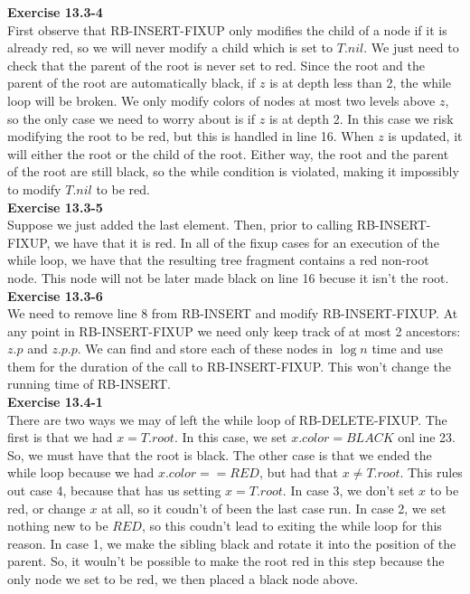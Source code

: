 \documentclass{article}
\begin{document}
\noindent\textbf{Exercise 13.3-4}\\

First observe that RB-INSERT-FIXUP only modifies the child of a node if it is already red, so we will never modify a child which is set to $T.nil$.  We just need to check that the parent of the root is never set to red. Since the root and the parent of the root are automatically black, if $z$ is at depth less than 2, the while loop will be broken.  We only modify colors of nodes at most two levels above $z$, so the only case we need to worry about is if $z$ is at depth 2.  In this case we risk modifying the root to be red, but this is handled in line 16.  When $z$ is updated, it will either the root or the child of the root. Either way, the root and the parent of the root are still black, so the while condition is violated, making it impossibly to modify $T.nil$ to be red. \\

\noindent\textbf{ Exercise 13.3-5} \\

Suppose we just added the last element. Then, prior to calling RB-INSERT-FIXUP, we have that it is red. In all of the fixup cases for an execution of the while loop, we have that the resulting tree fragment contains a red non-root node. This node will not be later made black on line 16 becuse it isn't the root. \\

\noindent\textbf{Exercise 13.3-6}\\

We need to remove line 8 from RB-INSERT and modify RB-INSERT-FIXUP.  At any point in RB-INSERT-FIXUP we need only keep track of at most 2 ancestors: $z.p$ and $z.p.p$.  We can find and store each of these nodes in $\log n$ time and use them for the duration of the call to RB-INSERT-FIXUP.  This won't change the running time of RB-INSERT.\\

\noindent\textbf{ Exercise 13.4-1} \\

There are two ways we may of left the while loop of RB-DELETE-FIXUP. The first is that we had $x = T.root$. In this case, we set $x.color = BLACK$ onl ine 23. So, we must have that the root is black. The other case is that we ended the while loop because we had $x.color == RED$, but had that $x\neq T.root$. This rules out case 4, because that has us setting $x=T.root$. In case 3, we don't set $x$ to be red, or change $x$ at all, so it coudn't of been the last case run. In case 2, we set nothing new to be $RED$, so this coudn't lead to exiting the while loop for this reason. In case 1, we make the sibling black and rotate it into the position of the parent. So, it wouln't be possible to make the root red in this step because the only node we set to be red, we then placed a black node above. 
\end{document}
